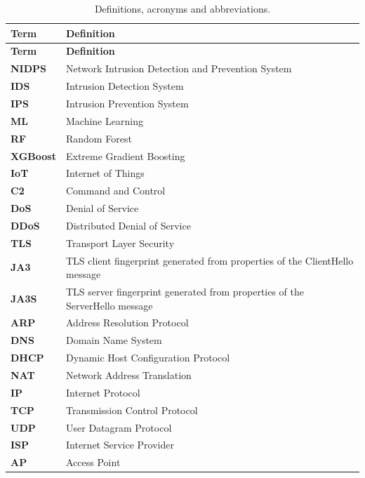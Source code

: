{\small
\begin{longtable}{|>{\raggedright\arraybackslash}p{}|>{\raggedright\arraybackslash}p{}|}
\caption{Definitions, acronyms and abbreviations.}\label{tab:1.1}\\
\hline
\textbf{Term} & \textbf{Definition} \\ \hline
\endfirsthead
\hline
\textbf{Term} & \textbf{Definition} \\ \hline
\endhead
\textbf{NIDPS} & Network Intrusion Detection and Prevention System \\ \hline
\textbf{IDS} & Intrusion Detection System \\ \hline
\textbf{IPS} & Intrusion Prevention System \\ \hline
\textbf{ML} & Machine Learning \\ \hline
\textbf{RF} & Random Forest \\ \hline
\textbf{XGBoost} & Extreme Gradient Boosting \\ \hline
\textbf{IoT} & Internet of Things \\ \hline
\textbf{C2} & Command and Control \\ \hline
\textbf{DoS} & Denial of Service \\ \hline
\textbf{DDoS} & Distributed Denial of Service \\ \hline
\textbf{TLS} & Transport Layer Security \\ \hline
\textbf{JA3} & TLS client fingerprint generated from properties of the ClientHello message \\ \hline
\textbf{JA3S} & TLS server fingerprint generated from properties of the ServerHello message \\ \hline
\textbf{ARP} & Address Resolution Protocol \\ \hline
\textbf{DNS} & Domain Name System \\ \hline
\textbf{DHCP} & Dynamic Host Configuration Protocol \\ \hline
\textbf{NAT} & Network Address Translation \\ \hline
\textbf{IP} & Internet Protocol \\ \hline
\textbf{TCP} & Transmission Control Protocol \\ \hline
\textbf{UDP} & User Datagram Protocol \\ \hline
\textbf{ISP} & Internet Service Provider \\ \hline
\textbf{AP} & Access Point \\ \hline

\end{longtable}}
